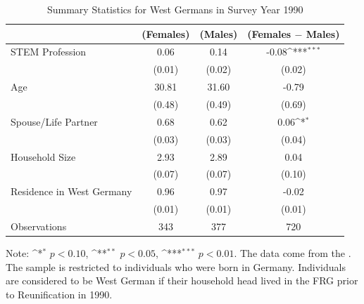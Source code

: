 \documentclass[a4paper, oneside, hyperfootnotes = false]{article}
\def\sym#1{\ifmmode^{#1}\else\(^{#1}\)\fi}
\begin{document}
{\begin{table}[ht]
    \caption{Summary Statistics for West Germans in Survey Year 1990}
    \label{tab:descr_summary_west}
    \begin{center}
        \begin{tabular}{l*{3}{c}}
        	\toprule
        	& (Females) & (Males) & (Females $-$ Males) \\
        	\midrule
        	STEM Profession & 0.06  & 0.14 &  -0.08\sym{***}      \\
        	&   (0.01)  & (0.02) & (0.02) \\
        	\addlinespace
        	Age         & 30.81     &  31.60   &    -0.79     \\
        	&     (0.48) &        (0.49)         &      (0.69) \\
        	\addlinespace
        	Spouse/Life Partner & 0.68       &  0.62   &     0.06\sym{*}      \\
        	&      (0.03)&          (0.03)&         (0.04) \\
        	\addlinespace
        	Household Size      &  2.93   &  2.89   &    0.04       \\
        	&          (0.07)&       (0.07)        &      (0.10)\\
        	\addlinespace
        	Residence in West Germany& 0.96    &  0.97   &    -0.02        \\
        	&         (0.01) &       (0.01)&  (0.01)\\
        	\midrule
        	Observations        &        343 &     377     &       720                \\
        	\bottomrule
        \end{tabular}
        
        \vspace{2mm}
        
        \parbox{10cm}{
        \linespread{1}\footnotesize Note: \sym{*} \(p<0.10\), \sym{**} \(p<0.05\), \sym{***} \(p<0.01\). The data come from the \cite{SOEP2023}. The sample is restricted to individuals who were born in Germany. Individuals are considered to be West German if their household head lived in the FRG prior to Reunification in 1990.}
        
    \end{center}
\end{table}

}
\end{document}
